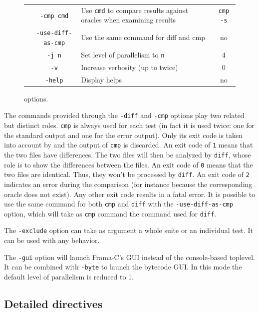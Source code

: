 \begin{figure}[ht]
\begin{center}
\begin{tabular}{|c|c|p{6cm}|c|}
& \texttt{-cmp cmd} & Use \texttt{cmd} to compare results against
oracles when examining results
& \texttt{cmp -s} \\
& \texttt{-use-diff-as-cmp} & Use the same command for diff and cmp &
no \\
& \texttt{-j n} & Set level of parallelism to \texttt{n} & 4 \\
& \texttt{-v} & Increase verbosity (up to twice) & 0 \\
& \texttt{-help} & Display helps & no \\
\hline
\end{tabular}
\end{center}
\caption{\ptests options.}\label{fig:ptests-options}
\end{figure}

The commands provided through the \texttt{-diff} and \texttt{-cmp}
options play two related but distinct roles. \texttt{cmp} is always
used for each test (in fact it is used twice: one for the standard output
and one for the error output). Only its exit code is taken into
account by \ptests and the output of \texttt{cmp} is discarded.
An exit code of \texttt{1} means that the two files have
differences. The two files will then be analyzed by \texttt{diff},
whose role is to show the differences between the files. An exit code
of \texttt{0} means that the two files are identical. Thus, they won't
be processed by \texttt{diff}. An exit code of \texttt{2} indicates an
error during the comparison (for instance because the corresponding
oracle does not exist). Any other exit code results in a fatal
error. It is possible to use the same command for both \texttt{cmp}
and \texttt{diff} with the \texttt{-use-diff-as-cmp} option, which
will take as \texttt{cmp} command the command used for \texttt{diff}.

The \texttt{-exclude} option can take as argument a whole suite or an
individual test. It can be used with any behavior.

The \texttt{-gui} option will launch Frama-C's GUI instead of the console-based
toplevel. It can be combined with \texttt{-byte} to launch the bytecode GUI. 
In this mode the default level of parallelism is reduced to 1.

\subsection{Detailed directives}\label{ptests:directives}


